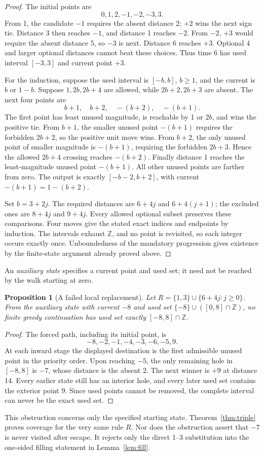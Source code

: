 \documentclass[11pt,a4paper]{article}
\newtheorem{proposition}[theorem]{Proposition}
\newcommand{\Z}{\mathbb Z}\newcommand{\N}{\mathbb N}
\begin{document}
\begin{proof}
The initial points are
\[
 0,1,2,-1,-2,-3,3.
\]
From 1, the candidate $-1$ requires the absent distance 2; $+2$ wins
the next sign tie. Distance 3 then reaches $-1$, and distance 1 reaches
$-2$. From $-2$, $+3$ would require the absent distance 5, so $-3$ is
next. Distance 6 reaches $+3$. Optional 4 and larger optional distances
cannot beat these choices. Thus time 6 has used interval $[-3,3]$ and
current point $+3$.

For the induction, suppose the used interval is $[-b,b]$, $b\ge1$, and
the current is $b$ or $1-b$. Suppose $1,2b,2b+4$ are allowed, while
$2b+2,2b+3$ are absent. The next four points are
\[
 b+1,\quad b+2,\quad -(b+2),\quad -(b+1).
\]
The first point has least unused magnitude, is reachable by 1 or $2b$,
and wins the positive tie. From $b+1$, the smaller unused point $-(b+1)$
requires the forbidden $2b+2$, so the positive unit move wins. From $b+2$,
the only unused point of smaller magnitude is $-(b+1)$, requiring the
forbidden $2b+3$. Hence the allowed $2b+4$ crossing reaches $-(b+2)$.
Finally distance 1 reaches the least-magnitude unused point $-(b+1)$.
All other unused points are farther from zero. The output is exactly
$[-b-2,b+2]$, with current $-(b+1)=1-(b+2)$.

Set $b=3+2j$. The required distances are $6+4j$ and $6+4(j+1)$;
the excluded ones are $8+4j$ and $9+4j$. Every allowed optional subset
preserves these comparisons. Four moves give the stated exact indices
and endpoints by induction. The intervals exhaust $\Z$, and no point is
revisited, so each integer occurs exactly once. Unboundedness of the mandatory progression gives
existence by the finite-state argument already proved above.
\end{proof}

An \emph{auxiliary state} specifies a current point and used set; it need
not be reached by the walk starting at zero.

\begin{proposition}[A failed local replacement]\label{prop:triple-obstruction}
Let $R=\{1,3\}\cup\{6+4j:j\ge0\}$. From the auxiliary state with
current $-8$ and used set $\{-8\}\cup([0,8]\cap\Z)$, no finite greedy
continuation has used set exactly $[-8,8]\cap\Z$.
\end{proposition}
\begin{proof}
The forced path, including its initial point, is
\[
 -8,-2,-1,-4,-3,-6,-5,9.
\]
At each inward stage the displayed destination is the first admissible unused
point in the priority order. Upon reaching $-5$, the only remaining hole in
$[-8,8]$ is $-7$, whose distance is the absent 2. The next winner is $+9$
at distance 14. Every earlier state still has an interior hole, and every
later used set contains the exterior point 9. Since used points cannot
be removed, the complete interval can never be the exact used set.
\end{proof}
This obstruction concerns only the specified starting state. Theorem~\ref{thm:triple} proves coverage for the
very same rule $R$. Nor does the obstruction assert that $-7$ is never
visited after escape. It rejects only the direct 1--3 substitution into
the one-sided filling statement in Lemma~\ref{lem:fill}.
\end{document}
